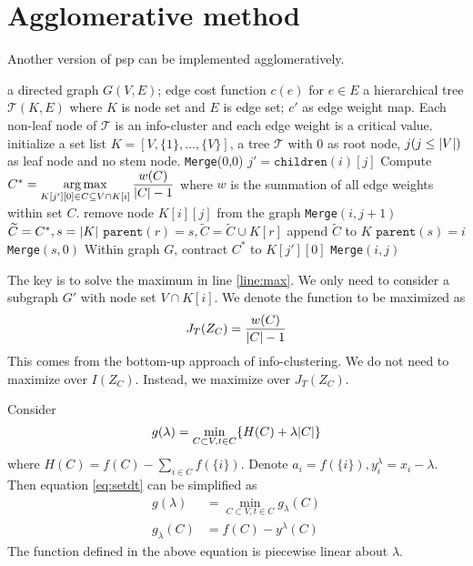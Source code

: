 \documentclass{article}
\begin{document}
\section{Agglomerative method}
Another version of psp can be implemented agglomeratively.
\begin{algorithm}
\caption{}\label{alg:psp_agg}
\begin{algorithmic}[1]
\REQUIRE a directed graph $G(V, E)$; edge cost function $c(e)$ for $e\in E$
\ENSURE a hierarchical tree $\mathcal{T}(K, E)$ where $K$ is node set and $E$ is edge set; $c'$ as edge weight map. Each non-leaf node of $\mathcal{T}$ is an info-cluster and each edge weight is a critical value. 
\STATE initialize a set list $K=[V, \{1\}, \dots, \{V\}]$, a tree $\mathcal{T}$ with 0 as root node, $j(j\leq \lvert V\rvert)$ as leaf node and no stem node.
\STATE \texttt{Merge}(0,0)
\STATE $j' = \texttt{children}(i)[j]$
\STATE Compute $C^* =\displaystyle \operatorname*{arg\,max}_{K[j'][0] \in C \subseteq V \cap K[i]} \frac{w(C)}{\lvert C\rvert-1}$ where $w$ is the summation of all edge weights within set $C$. \label{line:max}
\STATE remove node $K[i][j]$ from the graph
\STATE \texttt{Merge}$(i,j+1)$
\ENDIF
\ELSE
\STATE $\widetilde{C} = C^*, s=\lvert K\rvert$
\STATE  $\texttt{parent}(r) = s, \widetilde{C} = \widetilde{C} \cup K[r]$
\ENDIF
\STATE append $\widetilde{C} $ to $K$
\ENDFOR
\STATE $\texttt{parent}(s) = i$
\STATE \texttt{Merge}$(s,0)$
\STATE Within graph $G$, contract $C^*$ to $K[j'][0]$
\STATE \texttt{Merge}$(i,j)$
\ENDIF
\ENDFUNCTION
\end{algorithmic}
\end{algorithm}
The key is to solve the maximum in line \ref{line:max}.
We only need to consider a subgraph $G'$ with node set $V \cap K[i]$.
We denote the function to be maximized as
\begin{equation}
J_T(Z_C) = \frac{w(C)}{\lvert C\rvert-1}
\end{equation}
This comes from the bottom-up approach of info-clustering. We do not need to maximize over $I(Z_C)$. Instead, we maximize over $J_T(Z_C)$.

Consider
\begin{equation}\label{eq:setdt}
g(\lambda) = \min_{C\subset V, t \in C} \{ H(C) + \lambda\lvert C\rvert\}
\end{equation}
where $H(C) = f(C) - \sum_{i\in C} f(\{i\})$. Denote $a_i = f(\{i\}), y^{\lambda}_i = x_i - \lambda$. Then equation \ref{eq:setdt} can be simplified as 
\begin{align}\label{eq:setdt}
g(\lambda) &= \min_{C\subset V, t \in C} g_{\lambda}(C) \\
g_{\lambda}(C)  & = f(C) - y^{\lambda}(C)
\end{align}
The function defined in the above equation is piecewise linear about $\lambda$. 
\end{document}
